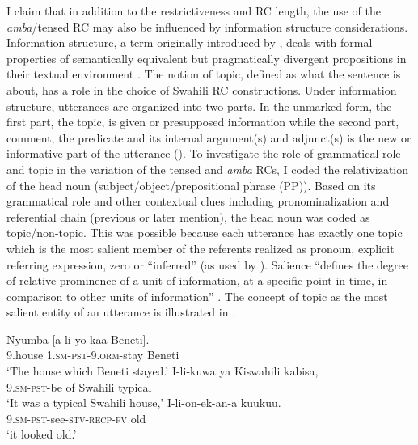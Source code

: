 \documentclass[output=paper,colorlinks,citecolor=brown]{langscibook}
\begin{document}
I claim that in addition to the restrictiveness and RC length, the use of the \textit{amba}\slash tensed RC may also be influenced by information structure considerations. Information structure, a term originally introduced by \citet{Halliday1967}, deals with formal properties of semantically equivalent but pragmatically divergent propositions in their textual environment \citep{Lambrecht1994}. The notion of topic, defined as what the sentence is about, has a role in the choice of Swahili RC constructions. Under information structure, utterances are organized into two parts. In the unmarked form, the first part, the topic, is given or presupposed information while the second part, comment, the predicate and its internal argument(s) and adjunct(s) is the new or informative part of the utterance (\citealt{Prince1981, Prince1992, GundelFretheim2006}). To investigate the role of grammatical role and topic in the variation of the tensed and \textit{amba} RCs, I coded the relativization of the head noun (subject/object/prepositional phrase (PP)). Based on its grammatical role and other contextual clues including pronominalization and referential chain (previous or later mention), the head noun was coded as topic/non-topic. This was possible because each utterance has exactly one topic which is the most salient member of the referents realized as pronoun, explicit referring expression, zero or “inferred” (as used by \citealt{Prince1981}). Salience “defines the degree of relative prominence of a unit of information, at a specific point in time, in comparison to other units of information” \citep{ChiarcosEtAl2011Salience}. The concept of topic as the most salient entity of an utterance is illustrated in .

\ea%
    \label{ex:mwamzandi:25}
    \ea%
    \label{ex:mwamzandi:25a}
    \gll    Nyumba [a-li-yo-kaa Beneti].\\
            9.house \textsc{1.sm-pst-9.orm-}stay Beneti\\
    \glt    ‘The house which Beneti stayed.’
    \ex%
    \label{ex:mwamzandi:25b}
    \gll    I-li-kuwa ya Kiswahili kabisa,\\
            \textsc{9.sm-pst-}be of Swahili typical\\
    \glt    ‘It was a typical Swahili house,’
    \ex%
    \label{ex:mwamzandi:25c}
    \gll    I-li-on-ek-an-a kuukuu.\\
            \textsc{9.sm-pst-}see\textsc{-stv-recp-fv} old\\
    \glt    ‘it looked old.’
    \z
\z
\end{document}
